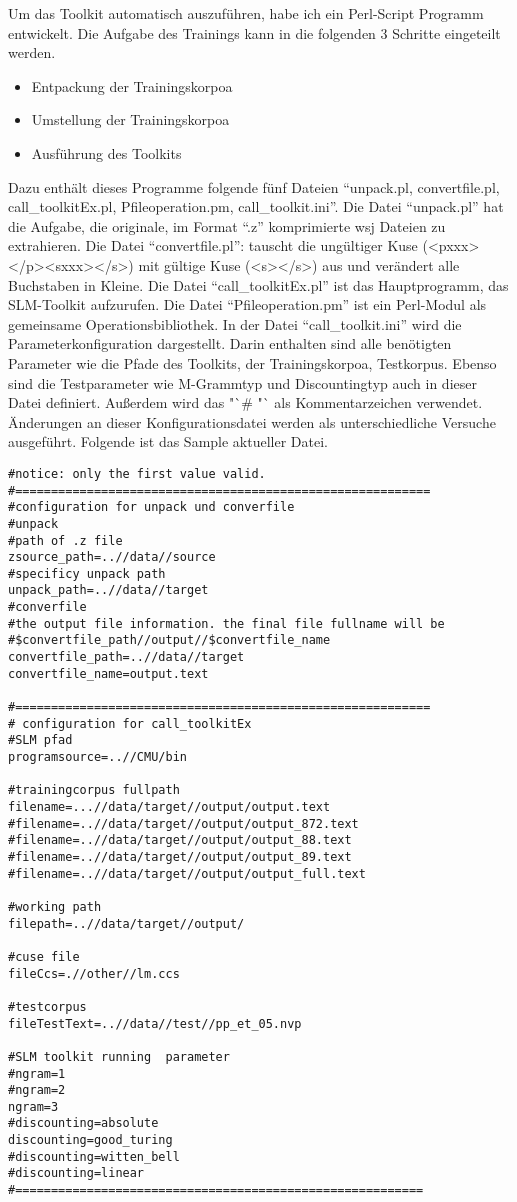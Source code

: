 
Um das Toolkit automatisch auszuf\"uhren, habe ich ein Perl-Script Programm entwickelt. Die Aufgabe des Trainings kann in die folgenden  3 Schritte eingeteilt werden.
\begin{itemize}
	\item Entpackung der Trainingskorpoa
	\item Umstellung der Trainingskorpoa
	\item Ausf\"uhrung des Toolkits
\end{itemize}
Dazu enth\"alt dieses Programme folgende f\"unf Dateien "`unpack.pl, convertfile.pl, call\_toolkitEx.pl, Pfileoperation.pm,  call\_toolkit.ini"'.
Die Datei "`unpack.pl"' hat die Aufgabe, die originale, im Format "`.z"' komprimierte  wsj Dateien zu extrahieren.
Die Datei "`convertfile.pl"': tauscht die ung\"ultiger Kuse (<pxxx></p><sxxx></s>) mit g\"ultige Kuse (<s></s>) aus und ver\"andert alle Buchstaben in Kleine. 
Die Datei "`call\_toolkitEx.pl"' ist das Hauptprogramm, das SLM-Toolkit aufzurufen. 
Die Datei "`Pfileoperation.pm"' ist ein Perl-Modul\cite{book_perl} als gemeinsame Operationsbibliothek.
In der Datei "`call\_toolkit.ini"'  wird die Parameterkonfiguration dargestellt. Darin enthalten sind alle ben\"otigten Parameter wie die Pfade des Toolkits, der Trainingskorpoa, Testkorpus. Ebenso sind die Testparameter wie M-Grammtyp und Discountingtyp auch in dieser Datei definiert. Au\ss erdem wird das "`\# "`  als Kommentarzeichen verwendet. \"Anderungen an dieser Konfigurationsdatei werden als unterschiedliche Versuche ausgef\"uhrt. Folgende ist das Sample aktueller Datei.

\begin{lstlisting}
#notice: only the first value valid.
#==========================================================
#configuration for unpack und converfile
#unpack
#path of .z file 
zsource_path=..//data//source
#specificy unpack path
unpack_path=..//data//target
#converfile
#the output file information. the final file fullname will be
#$convertfile_path//output//$convertfile_name
convertfile_path=..//data//target
convertfile_name=output.text

#==========================================================
# configuration for call_toolkitEx
#SLM pfad
programsource=..//CMU/bin

#trainingcorpus fullpath
filename=...//data/target//output/output.text
#filename=..//data/target//output/output_872.text
#filename=..//data/target//output/output_88.text
#filename=..//data/target//output/output_89.text
#filename=..//data/target//output/output_full.text

#working path
filepath=..//data/target//output/

#cuse file
fileCcs=.//other//lm.ccs

#testcorpus
fileTestText=..//data//test//pp_et_05.nvp

#SLM toolkit running  parameter
#ngram=1
#ngram=2
ngram=3
#discounting=absolute
discounting=good_turing
#discounting=witten_bell
#discounting=linear
#=========================================================

\end{lstlisting}
